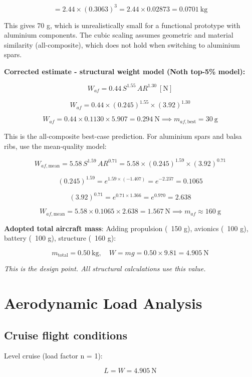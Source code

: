 \documentclass[10pt,a4paper]{article}
\begin{document}
\[
= 2.44 \times (0.3063)^3 = 2.44 \times 0.02873 = 0.0701\ \text{kg}
\]

This gives 70 g, which is unrealistically small for a functional prototype with aluminium components. The cubic scaling assumes geometric and material similarity (all-composite), which does not hold when switching to aluminium spars.

\textbf{Corrected estimate - structural weight model (Noth top-5\% model):}

\[
W_{af} = 0.44\, S^{1.55}\, AR^{1.30}\ [\text{N}]
\]

\[
W_{af} = 0.44 \times (0.245)^{1.55} \times (3.92)^{1.30}
\]

\[
W_{af} = 0.44 \times 0.1130 \times 5.907 = 0.294\ \text{N} \implies m_{af,\text{best}} = 30\ \text{g}
\]

This is the all-composite best-case prediction. For aluminium spars and balsa ribs, use the mean-quality model:

\[
W_{af,\text{mean}} = 5.58\, S^{1.59}\, AR^{0.71} = 5.58 \times (0.245)^{1.59} \times (3.92)^{0.71}
\]

\[
(0.245)^{1.59} = e^{1.59 \times (-1.407)} = e^{-2.237} = 0.1065
\]

\[
(3.92)^{0.71} = e^{0.71 \times 1.366} = e^{0.970} = 2.638
\]

\[
W_{af,\text{mean}} = 5.58 \times 0.1065 \times 2.638 = 1.567\ \text{N} \implies m_{af} \approx 160\ \text{g}
\]

\textbf{Adopted total aircraft mass}: Adding propulsion (~150 g), avionics (~100 g), battery (~100 g), structure (~160 g):

\[
\boxed{m_{\text{total}} = 0.50\ \text{kg}, \quad W = mg = 0.50 \times 9.81 = 4.905\ \text{N}}
\]

\textit{This is the design point. All structural calculations use this value.}

\newpage

\section{Aerodynamic Load Analysis}

\subsection{Cruise flight conditions}

Level cruise (load factor n = 1):

\[
L = W = 4.905\ \text{N}
\]
\end{document}
